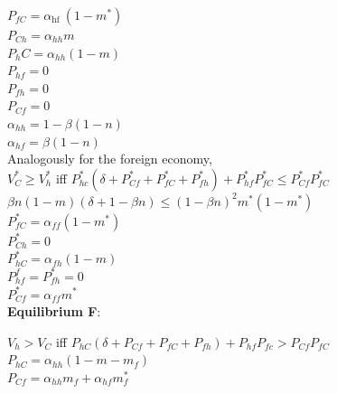 $P _ { f C } = \alpha _ { \text {hf } } \left( 1 - m ^ { * } \right)$\\

$P _ { C h } = \alpha_{hh} m$\\

$P_hC = \alpha_{hh} ( 1 - m )$\\

$P_{hf}= 0$\\

$P _ { f h } = 0$\\

$P _ { C f } = 0$\\

$\alpha _ { h h } = 1 -\beta ( 1 - n )$\\

$\alpha _ { h f } = \beta ( 1 - n )$\\


Analogously for the foreign economy, \\

$V _ { C } ^ { * } \geq V _ { h } ^ { * }$ iff $ P_{ hc }^ { * } \left( \delta + P_ { Cf } ^ { * } + P _ { f C } ^ { * } + P _ { fh } ^ { * } \right) + P  _ { hf } ^ { * } P _ { f C } ^ { * } \leq P _ { C f } ^ { * } P _ { f C }^*$\\

$\beta n ( 1 - m ) ( \delta + 1 - \beta n ) \leq ( 1 - \beta n ) ^ { 2 } m ^ { * } \left( 1 - m ^ { * } \right)$\\

$P _ { fC }^*  = \alpha_ { f f } ( 1 - m^* )$\\

$P_{Ch}^* = 0$\\

$P_{hC}^* = \alpha _ { fh } ( 1 - m )$\\

$P _ { h f } ^f= P _ { f h}^* = 0$\\

$P_{Cf}^* = \alpha _ { f f } m^*$\\


\textbf{Equilibrium F}: 

$ V_h > V_C$ iff $P_{ hC } \left( \delta + P_{C f} + P _ { f C } + P _ { f h } \right) + P _ { hf } P _ { f c } > P _ { C f } P_{fC}$\\

$P _ { h C } = \alpha _ { h h } \left( 1 - m - m _ { f } \right)$\\

$P _ { C f } = \alpha _ { h h }m_f+\alpha_{hf}m_f^*$\\

